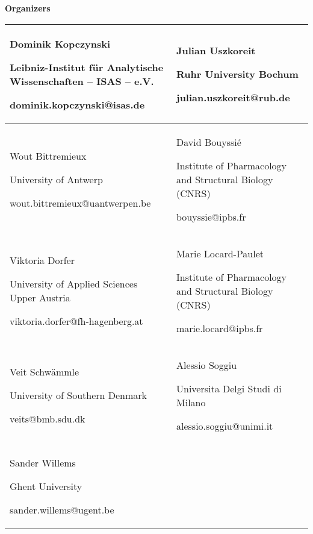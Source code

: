 \color{eubicRed}
{\noindent \Large \textbf{Organizers}}
\color{black}

\begin{table}[!h]
  \centering
  \begin{tabular}{ | L{0.47\textwidth} | L{0.47\textwidth} | }
    \hline
    Dominik Kopczynski

    Leibniz-Institut für Analytische Wissenschaften – ISAS – e.V.

    dominik.kopczynski@isas.de &
    Julian Uszkoreit

    Ruhr University Bochum

    julian.uszkoreit@rub.de \\
    \hline
    Wout Bittremieux

    University of Antwerp

    wout.bittremieux@uantwerpen.be &
    David Bouyssié

    Institute of Pharmacology and Structural Biology (CNRS)

    bouyssie@ipbs.fr \\
    \hline
    Viktoria Dorfer

    University of Applied Sciences Upper Austria

    viktoria.dorfer@fh-hagenberg.at &
    Marie Locard-Paulet

    Institute of Pharmacology and Structural Biology (CNRS)

    marie.locard@ipbs.fr\\
    \hline
    Veit Schwämmle

    University of Southern Denmark

    veits@bmb.sdu.dk &
    Alessio Soggiu

    Universita Delgi Studi di Milano

    alessio.soggiu@unimi.it \\
    \hline
    Sander Willems

    Ghent University

    sander.willems@ugent.be &
    \\
    \hline
  \end{tabular}
\end{table}
